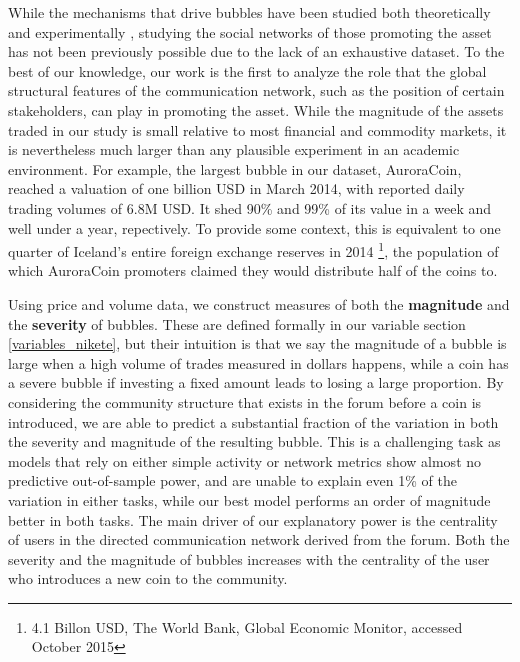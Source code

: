 While the mechanisms that drive bubbles have been studied both theoretically 
\cite{abolafia1988enacting, earl2007decision, bakker2010social, harras2011grow}
and experimentally
\cite{moinas2013bubble},
studying the social networks of those promoting the asset has not been previously possible due to the lack of an exhaustive dataset. To the best of our knowledge, our work is the first to analyze the role that the global structural features of the communication network, such as the position of certain stakeholders, can play in promoting the asset.
While the magnitude of the assets traded in our study is small relative to most financial and commodity markets, it is nevertheless much larger than
any plausible experiment in an academic environment.
For example, the largest bubble in our dataset, AuroraCoin, reached a valuation of one billion USD in March 2014,
with reported daily trading volumes of 6.8M USD. It shed 90\% and 99\% of its value in a week and well under a year, repectively.
To provide some context, this is equivalent to one quarter of Iceland's entire foreign exchange reserves in 2014 \footnote{4.1 Billon USD, The World Bank, Global Economic Monitor, accessed October 2015}, the population of which AuroraCoin promoters claimed they would distribute half of the coins to.

Using price and volume data, we construct measures of both the \textbf{magnitude} and the \textbf{severity} of bubbles.
These are defined formally in our variable section \ref{variables_nikete},
but their intuition is that we say the magnitude of a bubble is large when a high volume of trades measured in dollars happens,
while a coin has a severe bubble if investing a fixed amount leads to losing a large proportion. 
By considering the community structure that exists in the forum before a coin is introduced, we are able to predict a substantial fraction of the variation in both the severity and magnitude of the resulting bubble.
This is a challenging task as models that rely on either simple activity or network metrics show almost no predictive out-of-sample power, and are unable to explain even 1\% of the variation in either tasks,
while our best model performs an order of magnitude better in both tasks.
The main driver of our explanatory power is the centrality of users in the directed communication network derived from the forum. 
Both the severity and the magnitude of bubbles increases with the centrality of the user who introduces a new coin to the community.

